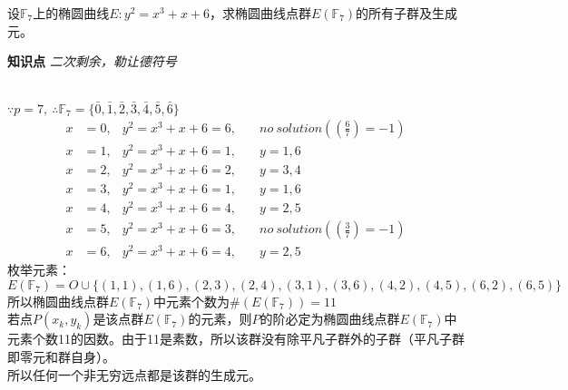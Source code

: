 设$\mathbb{F}_7$上的椭圆曲线$E:y^2=x^3+x+6$，求椭圆曲线点群$E(\mathbb{F}_7)$的所有子群及生成元。

\begin{tcolorbox}
    \textbf{知识点} 
    \textit{二次剩余，勒让德符号}
\end{tcolorbox}

\begin{solution}\ \\
    $\because p=7,\ \therefore\mathbb{F}_7=\{\bar 0, \bar 1, \bar 2, \bar 3, \bar 4, \bar 5, \bar 6\}$
    \begin{equation*}
        \begin{aligned}
            x&=0,&y^2=x^3+x+6=6,&\quad no\ solution ((\frac{6}{7})=-1)\\
            x&=1,&y^2=x^3+x+6=1,&\quad y=1,6\\
            x&=2,&y^2=x^3+x+6=2,&\quad y=3,4\\
            x&=3,&y^2=x^3+x+6=1,&\quad y=1,6\\
            x&=4,&y^2=x^3+x+6=4,&\quad y=2,5\\
            x&=5,&y^2=x^3+x+6=3,&\quad no\ solution ((\frac{3}{7})=-1)\\
            x&=6,&y^2=x^3+x+6=4,&\quad y=2,5
        \end{aligned}
    \end{equation*}
    枚举元素：
    \begin{equation*}
        E(\mathbb{F}_7)=O\cup\{(1,1),(1,6),(2,3),(2,4),(3,1),(3,6),(4,2),(4,5),(6,2),(6,5)\}
    \end{equation*}
    所以椭圆曲线点群$E(\mathbb{F}_7)$中元素个数为$\#(E(\mathbb{F}_7))=11$\\
    若点$P(x_k, y_k)$是该点群$E(\mathbb{F}_7)$的元素，则$P$的阶必定为椭圆曲线点群$E(\mathbb{F}_7)$中元素个数11的因数。由于11是素数，所以该群没有除平凡子群外的子群（平凡子群即零元和群自身）。\\
    所以任何一个非无穷远点都是该群的生成元。
\end{solution}  